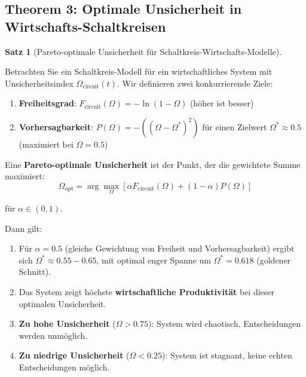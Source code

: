 \documentclass[a4paper, 12pt, twoside, openright]{report}
\theoremstyle{definition}
\theoremstyle{definition}
\newtheorem{satz}{Satz}[chapter]
\begin{document}
\subsection*{Theorem 3: Optimale Unsicherheit in Wirtschafts-Schaltkreisen}

\begin{satz}[Pareto-optimale Unsicherheit für Schaltkreis-Wirtschafts-Modelle]
\label{satz:optimal_unsicherheit_circuit}

Betrachten Sie ein Schaltkreis-Modell für ein wirtschaftliches System mit Unsicherheitsindex $\Omega_{\text{circuit}}(t)$. Wir definieren zwei konkurrierende Ziele:

\begin{enumerate}
    \item \textbf{Freiheitsgrad}: $F_{\text{circuit}}(\Omega) = -\ln(1-\Omega)$ (höher ist besser)
    \item \textbf{Vorhersagbarkeit}: $P(\Omega) = -((\Omega - \Omega^*)^2)$ für einen Zielwert $\Omega^* \approx 0.5$ (maximiert bei $\Omega = 0.5$)
\end{enumerate}

Eine \textbf{Pareto-optimale Unsicherheit} ist der Punkt, der die gewichtete Summe maximiert:
\begin{equation}
\Omega_{\text{opt}} = \arg\max_{\Omega} \left[ \alpha F_{\text{circuit}}(\Omega) + (1-\alpha) P(\Omega) \right]
\end{equation}

für $\alpha \in (0,1)$.

Dann gilt:

\begin{enumerate}
    \item Für $\alpha = 0.5$ (gleiche Gewichtung von Freiheit und Vorhersagbarkeit) ergibt sich $\Omega^* \approx 0.55 - 0.65$, mit optimal enger Spanne um $\Omega^* = 0.618$ (goldener Schnitt).
    
    \item Das System zeigt höchste \textbf{wirtschaftliche Produktivität} bei dieser optimalen Unsicherheit.
    
    \item \textbf{Zu hohe Unsicherheit} ($\Omega > 0.75$): System wird chaotisch, Entscheidungen werden unmöglich.
    
    \item \textbf{Zu niedrige Unsicherheit} ($\Omega < 0.25$): System ist stagnant, keine echten Entscheidungen möglich.
\end{enumerate}

\end{satz}
\end{document}
